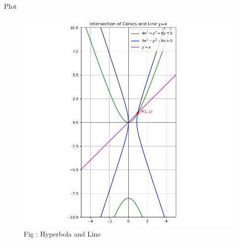 \documentclass{beamer}
\numberwithin{equation}{section}
\theoremstyle{remark}
\begin{document}
\begin{frame}{Plot}

\begin{figure}[h!]
  \centering
  \includegraphics[width=0.6\columnwidth]{figs/conics_intersection.png} 
   \caption*{Fig : Hyperbola and Line}
  \label{Fig1}
\end{figure}

\end{frame}
\end{document}
